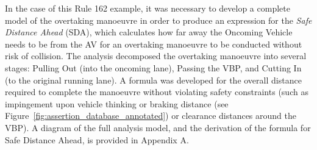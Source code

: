 
In the case of this Rule 162 example, it was necessary to develop a complete model of the overtaking manoeuvre in order to produce an expression for the \emph{Safe Distance Ahead} (SDA), which calculates how far away the Oncoming Vehicle needs to be from the AV for an overtaking manoeuvre to be conducted without risk of collision. The analysis decomposed the overtaking manoeuvre into several stages: Pulling Out (into the oncoming lane), Passing the VBP, and Cutting In (to the original running lane). A formula was developed for the overall distance required to complete the manoeuvre without violating safety constraints (such as impingement upon vehicle thinking or braking distance (see Figure~\ref{fig:assertion_database_annotated}) or clearance distances around the VBP). A diagram of the full analysis model, and the derivation of the formula for Safe Distance Ahead, is provided in Appendix A. 




